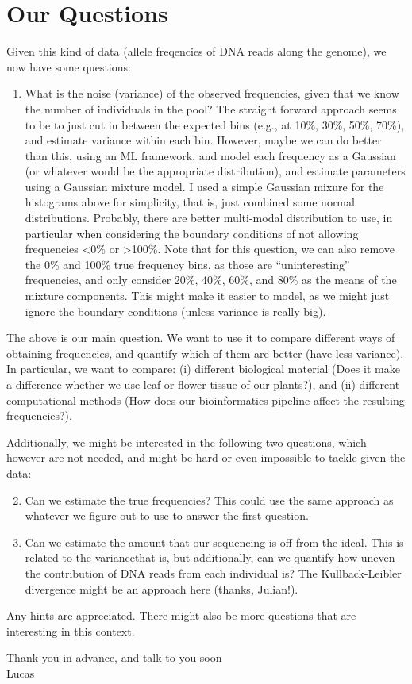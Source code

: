 \documentclass[letterpaper,10pt]{scrartcl}
\begin{document}
\section*{Our Questions}
\label{sec:Questions}

Given this kind of data (allele freqencies of DNA reads along the genome), we now have some questions:

\begin{enumerate}
 \item What is the noise (variance) of the observed frequencies, 
       given that we know the number of individuals in the pool?
       The straight forward approach seems to be to just cut in between the expected bins (e.g., at 10\%, 30\%, 50\%, 70\%),
       and estimate variance within each bin.
       However, maybe we can do better than this, using an ML framework, and model each frequency as a Gaussian
       (or whatever would be the appropriate distribution), and estimate parameters using a Gaussian mixture model.
       I used a simple Gaussian mixure for the histograms above for simplicity,
       that is, just combined some normal distributions. Probably, there are better multi-modal distribution to use,
       in particular when considering the boundary conditions of not allowing frequencies
       \textless 0\% or \textgreater 100\%.
       Note that for this question, we can also remove the 0\% and 100\% true frequency bins, 
       as those are ``uninteresting'' frequencies, and only consider 20\%, 40\%, 60\%, and 80\%
       as the means of the mixture components.
       This might make it easier to model, as we might just ignore the boundary conditions (unless variance is really big).
\end{enumerate}

The above is our main question. We want to use it to compare different ways of obtaining frequencies,
and quantify which of them are better (have less variance). 
In particular, we want to compare: 
(i) different biological material (Does it make a difference whether we use leaf or flower tissue of our plants?), and
(ii) different computational methods (How does our bioinformatics pipeline affect the resulting frequencies?).

Additionally, we might be interested in the following two questions, which however are not needed,
and might be hard or even impossible to tackle given the data:

\begin{enumerate}
 \setcounter{enumi}{1}
 \item Can we estimate the true frequencies? 
       This could use the same approach as whatever we figure out to use to answer the first question.
 \item Can we estimate the amount that our sequencing is off from the ideal.
       This is related to the variancethat is, but additionally, 
       can we quantify how uneven the contribution of DNA reads from each individual is?
       The Kullback-Leibler divergence might be an approach here (thanks, Julian!).
\end{enumerate}

Any hints are appreciated. There might also be more questions that are interesting in this context.

Thank you in advance, and talk to you soon \\
Lucas
\end{document}
